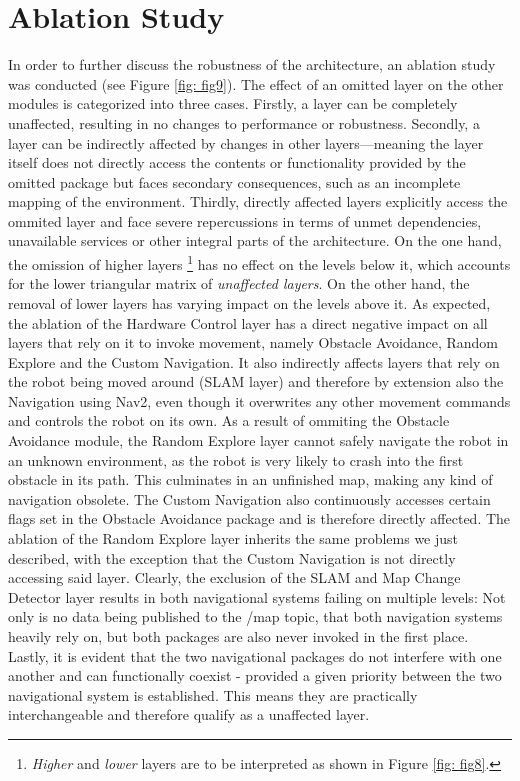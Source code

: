 \documentclass[%
paper=A4,               %
twoside=true,           %
openright,              %
11pt,                   %
bibliography=totoc,     %
titlepage=on,           %
DIV=12,                 %
BCOR=1.5cm,             %
parskip=half,            %
final
]{scrreprt}
\begin{document}
	
	
	\section{Ablation Study}  
	In order to further discuss the robustness of the architecture, an ablation study was conducted (see Figure \ref{fig: fig9}). The effect of an omitted layer on the other modules is categorized into three cases. Firstly, a layer can be completely unaffected, resulting in no changes to performance or robustness. Secondly, a layer can be indirectly affected by changes in other layers—meaning the layer itself does not directly access the contents or functionality provided by the omitted package but faces secondary consequences, such as an incomplete mapping of the environment. Thirdly, directly affected layers explicitly access the ommited layer and face severe repercussions in terms of unmet dependencies, unavailable services or other integral parts of the architecture. On the one hand, the omission of higher layers \footnote{\textit{Higher} and \textit{lower} layers are to be interpreted as shown in Figure \ref{fig: fig8}.} has no effect on the levels below it, which accounts for the lower triangular matrix of \textit{unaffected layers}. On the other hand, the removal of lower layers has varying impact on the levels above it. \newline 
	As expected, the ablation of the Hardware Control layer has a direct negative impact on all layers that rely on it to invoke movement, namely Obstacle Avoidance, Random Explore and the Custom Navigation. It also indirectly affects layers that rely on the robot being moved around (SLAM layer) and therefore by extension also the Navigation using Nav2, even though it overwrites any other movement commands and controls the robot on its own. \newline
	As a result of ommiting the Obstacle Avoidance module, the Random Explore layer cannot safely navigate the robot in an unknown environment, as the robot is very likely to crash into the first obstacle in its path. This culminates in an unfinished map, making any kind of navigation obsolete. The Custom Navigation also continuously accesses certain flags set in the Obstacle Avoidance package and is therefore directly affected. \newline
	The ablation of the Random Explore layer inherits the same problems we just described, with the exception that the Custom Navigation is not directly accessing said layer. \newline
	Clearly, the exclusion of the SLAM and Map Change Detector layer results in both navigational systems failing on multiple levels: Not only is no data being published to the /map topic, that both navigation systems heavily rely on, but both packages are also never invoked in the first place.  
	Lastly, it is evident that the two navigational packages do not interfere with one another and can functionally coexist - provided a given priority between the two navigational system is established. This means they are practically interchangeable and therefore qualify as a unaffected layer. 
	
\end{document}

